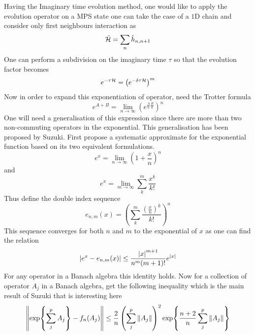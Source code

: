         Having the Imaginary time evolution method, one would like to apply the evolution operator on a MPS state one can take the case of a $1$D chain and consider only first neighbours interaction as
        \begin{equation}
            \hat{\mathcal H} = \sum_n \hat{h}_{n,n+1}
        \end{equation}
        One can perform a subdivision on the imaginary time $\tau$ so that the evolution factor becomes
        \begin{equation}
            e^{-\tau \mathcal H} = \left(e^{-\delta\tau \mathcal H}\right)^m
        \end{equation}
        Now in order to expand this exponentiation of operator, need the Trotter formula
        \begin{equation}
            e^{A+B} = \lim_{n\rightarrow\infty}\left(e^{\frac{A}{n}\frac{B}{n}}\right)^n
        \end{equation}
        One will need a generalisation of this expression since there are more than two non-commuting operators in the exponential. This generalisation has been proposed by Suzuki. First propose a systematic approximate for the exponential function based on its two equivalent formulations. 
        \begin{equation}
            e^x = \lim_{n\rightarrow\infty}\left(1+\frac{x}{n}\right)^n
        \end{equation}
        and
        \begin{equation}
            e^x = \lim_{m\rightarrow\infty}\sum^m_k\frac{x^k}{k!}
        \end{equation}
        Thus define the double index sequence
        \begin{equation}
            e_{n,m}(x) = \left(\sum^m_k\frac{\left(\frac{x}{n}\right)^k}{k!}\right)^n
        \end{equation}
        This sequence converges for both $n$ and $m$ to the exponential of $x$ as one can find the relation
        \begin{equation}
            \abs{e^x - e_{n,m}(x)} \leq \frac{\abs{x}^{m+1}}{n^m(m+1)!}e^{\abs{x}}
        \end{equation}
        For any operator in a Banach algebra this identity holds. Now for a collection of operator ${A_j}$ in a Banach algebra, get the following inequality which is the main result of Suzuki that is interesting here
        \begin{equation}
            \norm{\exp{\sum^p_j A_j} - f_n({A_j})} \leq \frac{2}{n}\left(\sum^p_j \norm{A_j}\right)^2 \exp{\frac{n+2}{n}\sum^p_j \norm{A_j}}
        \end{equation}
